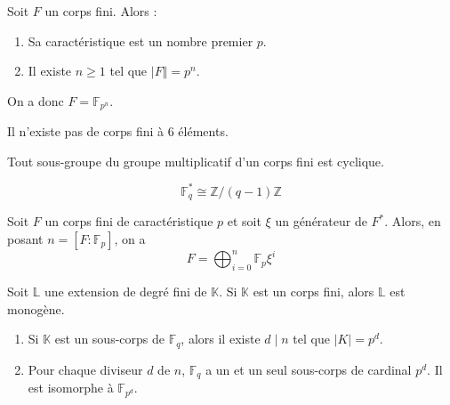 
  \begin{theorem}
    Soit $F$ un corps fini. Alors :
    \begin{enumerate}[label=(\roman*)]
      \item Sa caractéristique est un nombre premier $p$.
      \item Il existe $n \geq 1$ tel que $\vert F \Vert = p^n$.
    \end{enumerate}
    On a donc $F = \mathbb{F}_{p^n}$.
  \end{theorem}

  \begin{example}
    Il n'existe pas de corps fini à $6$ éléments.
  \end{example}

  \begin{theorem}
    Tout sous-groupe du groupe multiplicatif d'un corps fini est cyclique.
  \end{theorem}

  \begin{corollary}
    \[ \mathbb{F}_q^* \cong \mathbb{Z}/(q-1)\mathbb{Z} \]
  \end{corollary}

  \begin{proposition}
    Soit $F$ un corps fini de caractéristique $p$ et soit $\xi$ un générateur de $F^*$. Alors, en posant $n = [F:\mathbb{F}_p]$, on a
    \[ F = \bigoplus_{i=0}^n \mathbb{F}_p \xi^i \]
  \end{proposition}

  \begin{theorem}
    Soit $\mathbb{L}$ une extension de degré fini de $\mathbb{K}$. Si $\mathbb{K}$ est un corps fini, alors $\mathbb{L}$ est monogène.
  \end{theorem}


  \begin{theorem}
    \begin{enumerate}[label=(\roman*)]
      \item Si $\mathbb{K}$ est un sous-corps de $\mathbb{F}_q$, alors il existe $d \mid n$ tel que $\vert K \vert = p^d$.
      \item Pour chaque diviseur $d$ de $n$, $\mathbb{F}_q$ a un et un seul sous-corps de cardinal $p^d$. Il est isomorphe à $\mathbb{F}_{p^d}$.
    \end{enumerate}
  \end{theorem}

